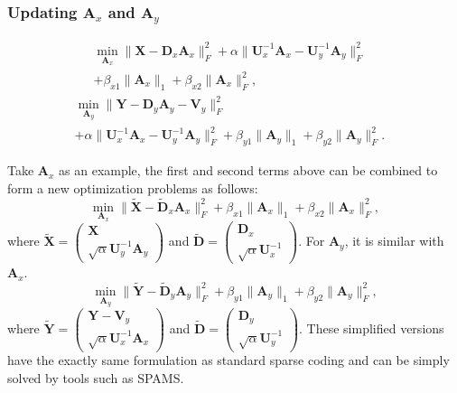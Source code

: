 \documentclass[10pt,twocolumn,letterpaper]{article}
\begin{document}
\subsubsection{Updating $\mathbf{A}_{x}$ and $\mathbf{A}_{y}$}

\begin{equation}
\begin{split}
\min_{\mathbf{A}_{x}}
\|\mathbf{X}-\mathbf{D}_{x}\mathbf{A}_{x}\|_{F}^{2}
+
\alpha
\|\mathbf{U}_{x}^{-1}\mathbf{A}_{x}-\mathbf{U}_{y}^{-1}\mathbf{A}_{y}\|_{F}^{2}
&
\\
+
\beta_{x1}\|\mathbf{A}_{x}\|_{1}
+
\beta_{x2}\|\mathbf{A}_{x}\|_{F}^{2},
\end{split}
\end{equation}
\begin{equation}
\begin{split}
\min_{\mathbf{A}_{y}}
\|\mathbf{Y}-\mathbf{D}_{y}\mathbf{A}_{y}-\mathbf{V}_{y}\|_{F}^{2}
&
\\
+
\alpha
\|\mathbf{U}_{x}^{-1}\mathbf{A}_{x}-\mathbf{U}_{y}^{-1}\mathbf{A}_{y}\|_{F}^{2}
+
\beta_{y1}\|\mathbf{A}_{y}\|_{1}
+
\beta_{y2}\|\mathbf{A}_{y}\|_{F}^{2}.
\end{split}
\end{equation}

Take $\mathbf{A}_{x}$ as an example, the first and second terms above can be combined to form a new optimization problems as follows:
\begin{equation}
\min_{\mathbf{A}_{x}}
\|\widetilde{\mathbf{X}}-\widetilde{\mathbf{D}}_{x}\mathbf{A}_{x}\|_{F}^{2}
+
\beta_{x1}\|\mathbf{A}_{x}\|_{1}
+
\beta_{x2}\|\mathbf{A}_{x}\|_{F}^{2},
\end{equation}
where 
$
\widetilde{\mathbf{X}}
=
\left(\begin{array}{c}
\mathbf{X}
\\
\sqrt{\alpha}\mathbf{U}_{y}^{-1}\mathbf{A}_{y}
\end{array}\right)
$
and
$
\widetilde{\mathbf{D}}
=
\left(\begin{array}{c}
\mathbf{D}_{x}
\\
\sqrt{\alpha}\mathbf{U}_{x}^{-1}
\end{array}\right)
$.
For $\mathbf{A}_{y}$, it is similar with $\mathbf{A}_{x}$.
\begin{equation}
\min_{\mathbf{A}_{y}}
\|\widetilde{\mathbf{Y}}-\widetilde{\mathbf{D}}_{y}\mathbf{A}_{y}\|_{F}^{2}
+
\beta_{y1}\|\mathbf{A}_{y}\|_{1}
+
\beta_{y2}\|\mathbf{A}_{y}\|_{F}^{2},
\end{equation}
where 
$
\widetilde{\mathbf{Y}}
=
\left(\begin{array}{c}
\mathbf{Y}-\mathbf{V}_{y}
\\
\sqrt{\alpha}\mathbf{U}_{x}^{-1}\mathbf{A}_{x}
\end{array}\right)
$
and
$
\widetilde{\mathbf{D}}
=
\left(\begin{array}{c}
\mathbf{D}_{y}
\\
\sqrt{\alpha}\mathbf{U}_{y}^{-1}
\end{array}\right)
$.
These simplified versions have the exactly same formulation as standard sparse coding and can be simply solved by tools such as SPAMS.
\end{document}
